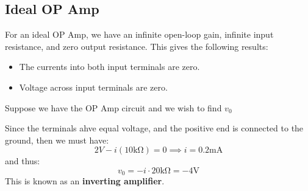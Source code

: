 \documentclass{article}
\newcommand{\equals}{=}
\begin{document}
\subsection{Ideal OP Amp}
For an ideal OP Amp, we have an infinite open-loop gain, infinite input resistance, and zero output resistance. This gives the following results:
\begin{itemize}
    \item The currents into both input terminals are zero.
    \item Voltage across input terminals are zero.
\end{itemize}
\begin{example}
    Suppose we have the OP Amp circuit and we wish to find $v_0$
    \begin{center}
    \end{center}
    Since the terminals ahve equal voltage, and the positive end is connected to the ground, then we must have:
    \begin{equation*}
        2V - i(10\si{\kilo\ohm}) = 0 \implies i = 0.2\si{\milli\ampere}
    \end{equation*}
    and thus:
    \begin{equation*}
        v_0 = -i\cdot 20\si{\kilo\ohm} = -4\si{\volt}
    \end{equation*}
    This is known as an \textbf{inverting amplifier}.
\end{example}
\end{document}
